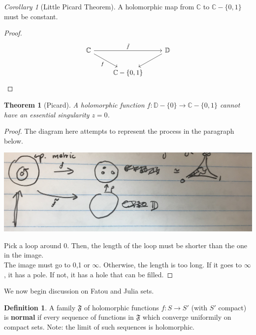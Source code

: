 \documentclass[a4paper, 11pt]{book}
\newtheorem{theorem}{Theorem}
\theoremstyle{definition}
\newtheorem{definition}{Definition}[section]
\theoremstyle{remark}
\newtheorem{corollary}{Corollary}[theorem]
\begin{document}
    \begin{corollary}[Little Picard Theorem]
        A holomorphic map from $\mathbb{C}$ to $\mathbb{C}-\{0,1\}$ must be constant.
    \end{corollary}
    \begin{proof}
        \begin{equation*}
            \begin{tikzcd}
                \mathbb{C} \arrow[rr, "\tilde{f}"] \arrow[dr, "f",swap]&  & \mathbb{D}\arrow[dl, ""]\\ 
            & \mathbb{C}-\{0,1\} &
            \end{tikzcd}
        \end{equation*}
    \end{proof}

    \begin{theorem}[Picard]
        A holomorphic function $f:\mathbb{D}-\{0\}\to\mathbb{C}-\{0,1\}$ cannot have an essential singularity $z=0$.
    \end{theorem}
    \begin{proof}
        The diagram here attempts to represent the process in the paragraph below.
        \begin{center}
            \includegraphics[scale=0.05]{IMG_1023}
        \end{center}
        Pick a loop around 0. Then, the length of the loop must be shorter than the one in the image.\\
        The image must go to 0,1 or $\infty$. Otherwise, the length is too long. If it goes to $\infty$, it has a pole. If not, it
        has a hole that can be filled.
    \end{proof}

    We now begin discussion on Fatou and Julia sets.\\

    \begin{definition}
        A family $\mathfrak{F}$ of holomorphic functions $f:S\to S'$ (with $S'$ compact) is \textbf{normal} if every sequence
        of functions in $\mathfrak{F}$ which converge uniformily on compact sets. Note: the limit of such sequences is holomorphic.
    \end{definition}
\end{document}
